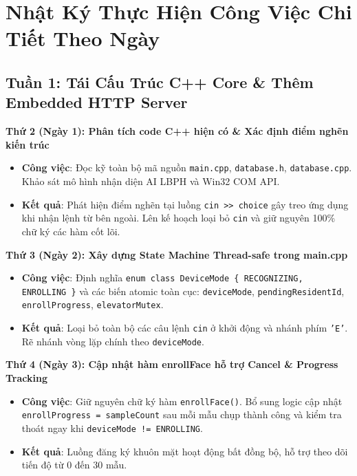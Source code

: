 \documentclass[12pt,a4paper]{article}
\begin{document}
\newpage

\section{Nhật Ký Thực Hiện Công Việc Chi Tiết Theo Ngày}

\subsection{Tuần 1: Tái Cấu Trúc C++ Core \& Thêm Embedded HTTP Server}

\begin{daybox}
\textbf{Thứ 2 (Ngày 1): Phân tích code C++ hiện có \& Xác định điểm nghẽn kiến trúc}
\begin{itemize}[leftmargin=*]
    \item \textbf{Công việc}: Đọc kỹ toàn bộ mã nguồn \texttt{main.cpp}, \texttt{database.h}, \texttt{database.cpp}. Khảo sát mô hình nhận diện AI LBPH và Win32 COM API.
    \item \textbf{Kết quả}: Phát hiện điểm nghẽn tại luồng \texttt{cin >> choice} gây treo ứng dụng khi nhận lệnh từ bên ngoài. Lên kế hoạch loại bỏ \texttt{cin} và giữ nguyên 100\% chữ ký các hàm cốt lõi.
\end{itemize}
\end{daybox}

\begin{daybox}
\textbf{Thứ 3 (Ngày 2): Xây dựng State Machine Thread-safe trong main.cpp}
\begin{itemize}[leftmargin=*]
    \item \textbf{Công việc}: Định nghĩa \texttt{enum class DeviceMode \{ RECOGNIZING, ENROLLING \}} và các biến atomic toàn cục: \texttt{deviceMode}, \texttt{pendingResidentId}, \texttt{enrollProgress}, \texttt{elevatorMutex}.
    \item \textbf{Kết quả}: Loại bỏ toàn bộ các câu lệnh \texttt{cin} ở khởi động và nhánh phím \texttt{'E'}. Rẽ nhánh vòng lặp chính theo \texttt{deviceMode}.
\end{itemize}
\end{daybox}

\begin{daybox}
\textbf{Thứ 4 (Ngày 3): Cập nhật hàm enrollFace hỗ trợ Cancel \& Progress Tracking}
\begin{itemize}[leftmargin=*]
    \item \textbf{Công việc}: Giữ nguyên chữ ký hàm \texttt{enrollFace()}. Bổ sung logic cập nhật \texttt{enrollProgress = sampleCount} sau mỗi mẫu chụp thành công và kiểm tra thoát ngay khi \texttt{deviceMode != ENROLLING}.
    \item \textbf{Kết quả}: Luồng đăng ký khuôn mặt hoạt động bất đồng bộ, hỗ trợ theo dõi tiến độ từ 0 đến 30 mẫu.
\end{itemize}
\end{daybox}
\end{document}
